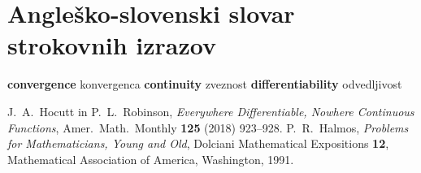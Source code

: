 \documentclass[a4paper,12pt]{article}
\theoremstyle{definition}
\theoremstyle{plain}
\newcommand{\geslo}[2]{\noindent \textbf{#1} \quad #2 \hfill \break}
\begin{document}
\section*{Angleško-slovenski slovar strokovnih izrazov}
\geslo{convergence}{konvergenca}
\geslo{continuity}{zveznost}
\geslo{differentiability}{odvedljivost}


\begin{thebibliography}{1}
    J.~A.~Hocutt in P.~L.~Robinson, \emph{Everywhere Differentiable, Nowhere Continuous Functions}, Amer.~Math.~Monthly \textbf{125} (2018) 923--928.
    P.~R.~Halmos, \emph{Problems for Mathematicians, Young and Old}, Dolciani Mathematical Expositions \textbf{12}, Mathematical Association of America, Washington, 1991.
\end{thebibliography}
\end{document}
